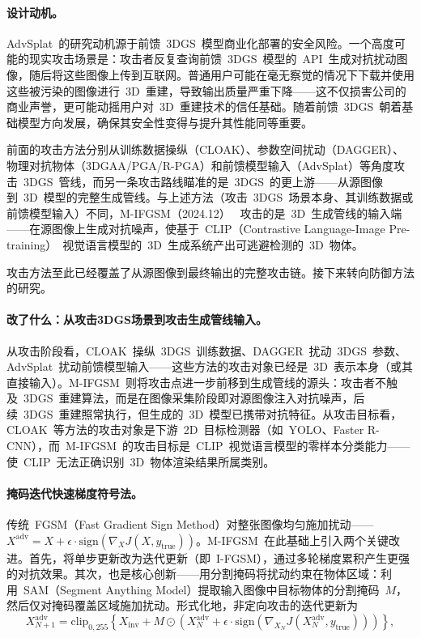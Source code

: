 \paragraph{设计动机。}
AdvSplat~的研究动机源于前馈~3DGS~模型商业化部署的安全风险。一个高度可能的现实攻击场景是：攻击者反复查询前馈~3DGS~模型的~API~生成对抗扰动图像，随后将这些图像上传到互联网。普通用户可能在毫无察觉的情况下下载并使用这些被污染的图像进行~3D~重建，导致输出质量严重下降——这不仅损害公司的商业声誉，更可能动摇用户对~3D~重建技术的信任基础。随着前馈~3DGS~朝着基础模型方向发展，确保其安全性变得与提升其性能同等重要。

前面的攻击方法分别从训练数据操纵（CLOAK）、参数空间扰动（DAGGER）、物理对抗物体（3DGAA/PGA/R-PGA）和前馈模型输入（AdvSplat）等角度攻击~3DGS~管线，而另一条攻击路线瞄准的是~3DGS~的更上游——从源图像到~3D~模型的完整生成管线。与上述方法（攻击~3DGS~场景本身、其训练数据或前馈模型输入）不同，M-IFGSM（2024.12）~\cite{2412_02803} 攻击的是~3D~生成管线的输入端——在源图像上生成对抗噪声，使基于~CLIP（Contrastive Language-Image Pre-training）~视觉语言模型的~3D~生成系统产出可逃避检测的~3D~物体。

攻击方法至此已经覆盖了从源图像到最终输出的完整攻击链。接下来转向防御方法的研究。

\paragraph{改了什么：从攻击3DGS场景到攻击生成管线输入。}
从攻击阶段看，CLOAK~操纵~3DGS~训练数据、DAGGER~扰动~3DGS~参数、AdvSplat~扰动前馈模型输入——这些方法的攻击对象已经是~3D~表示本身（或其直接输入）。M-IFGSM~则将攻击点进一步前移到生成管线的源头：攻击者不触及~3DGS~重建算法，而是在图像采集阶段即对源图像注入对抗噪声，后续~3DGS~重建照常执行，但生成的~3D~模型已携带对抗特征。从攻击目标看，CLOAK~等方法的攻击对象是下游~2D~目标检测器（如~YOLO、Faster R-CNN），而~M-IFGSM~的攻击目标是~CLIP~视觉语言模型的零样本分类能力——使~CLIP~无法正确识别~3D~物体渲染结果所属类别。

\paragraph{掩码迭代快速梯度符号法。}
传统~FGSM（Fast Gradient Sign Method）对整张图像均匀施加扰动——$X^{\text{adv}} = X + \epsilon \cdot \text{sign}(\nabla_X J(X, y_{\text{true}}))$。M-IFGSM~在此基础上引入两个关键改进。首先，将单步更新改为迭代更新（即~I-FGSM），通过多轮梯度累积产生更强的对抗效果。其次，也是核心创新——用分割掩码将扰动约束在物体区域：利用~SAM（Segment Anything Model）提取输入图像中目标物体的分割掩码~$M$，然后仅对掩码覆盖区域施加扰动。形式化地，非定向攻击的迭代更新为
\begin{equation}
    X_{N+1}^{\text{adv}} = \text{clip}_{0,255} \left\{ X_{\text{inv}} + M \odot \left( X_N^{\text{adv}} + \epsilon \cdot \text{sign}\left(\nabla_{X_N} J(X_N^{\text{adv}}, y_{\text{true}})\right) \right) \right\},
\end{equation}


